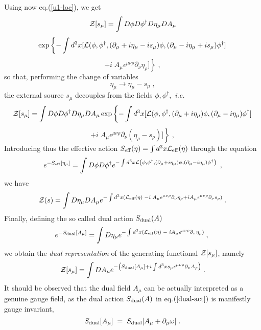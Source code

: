 \documentclass[a4paper,12pt]{article}
\begin{document}
\noindent Using now eq.(\ref{u1-loc}), we get
$$
{\cal Z}[s_\mu]=\int D\phi D\phi ^{\dagger }D\eta _\mu DA_\mu $$
$$
\exp \left\{-\int d^3x [ {\cal L}( \phi ,\phi ^{\dagger }, (\partial _\mu +i\eta _\mu -is_\mu )\phi
  ,(\partial _\mu -i\eta _\mu +is_\mu ) \phi ^\dagger ]\right.
$$
\begin{equation}
\left. + i \;A_\mu \epsilon ^{\mu \nu \rho }\partial _\nu \eta_\rho ] \right\}\;,
\end{equation}
so that, performing the change of variables
\begin{equation}
\label{change}
\eta _\mu \to \eta _\mu - s_\mu \;,
\end{equation}
the external source $s_\mu $ decouples from the fields $\phi ,\phi
^{\dagger },$ {\it i.e.}
$$
{\cal Z}[s_\mu]=\int D\phi D\phi ^{\dagger }D\eta _\mu DA_\mu \exp \left\{-\int d^3x [ {\cal
    L}( \phi ,\phi ^{\dagger },(\partial _\mu +i\eta_\mu)\phi ,(\partial_\mu -i\eta_\mu)\phi ^{\dagger }]\right.
$$
\begin{equation}
\label{g-f3}
\left. + i \;A_\mu \epsilon ^{\mu \nu \rho }\partial _\nu (\eta_\rho - s_\rho )] \right\}\;,
\end{equation}
Introducing thus the effective action $S_{{\rm eff}}(\eta )=\int d^3x{\cal L}%
_{{\rm eff}}(\eta )\;$through the equation
\begin{equation}
e^{-S_{{\rm eff}}[\eta_\mu ]}=\int D\phi D\phi ^{\dagger }e^{-\int d^3x{\cal L}%
\left( \phi ,\phi ^{\dagger },(\partial _\mu +i\eta _\mu )\phi ,(\partial
_\mu -i\eta _\mu )\phi ^{\dagger }\right) \;\;},  \label{eff-act}
\end{equation}
we have
\[
{\cal Z}(s)=\int D\eta _\mu DA_\mu e^{-\int d^3x\left( {\cal L}_{%
      {\rm eff}}(\eta )\;-i\;A_\mu \epsilon ^{\mu \nu \rho }\partial
    _\nu \eta _\rho + i A_\mu \epsilon ^{\mu \nu \rho }\partial _\nu
    s_\rho \right) \;}.
\]
Finally, defining the so called dual action $S_{{\rm dual}}(A)$
\begin{equation}
  \label{dual-act}
e^{-S_{{\rm dual}}[A_\mu]}=\int D\eta _\mu e^{-\int d^3x\left( {\cal L}_{{\rm eff%
}}(\eta )\;-\;iA_\mu \epsilon^{\mu \nu \rho }\partial _\nu \eta _\rho
\right) \;},\;
\end{equation}
we obtain the {\it dual representation\/} of the generating functional
${\cal Z}[s_\mu]$, namely
\begin{equation}
 \label{g-ff}
{\cal Z}[s_\mu]=\int DA_\mu e^{-\left( S_{{\rm dual}}[A_\mu]+i \int d^3xs_\mu
\epsilon ^{\mu \nu \rho }\partial _\nu A_\rho \right) \;}.
\end{equation}
It should be observed that the dual field $A_\mu $ can be actually
interpreted as a genuine gauge field, as the dual action $S_{{\rm
    dual}}(A)$ in eq.$\left( {\rm {\ref{dual-act}}}\right) $ is
manifestly gauge invariant,
\begin{equation}
S_{{\rm dual}}[A_\mu ]\;=\;S_{{\rm dual}}[A_\mu +\partial _\mu \omega ]\;.
\label{gin}
\end{equation}
\end{document}
